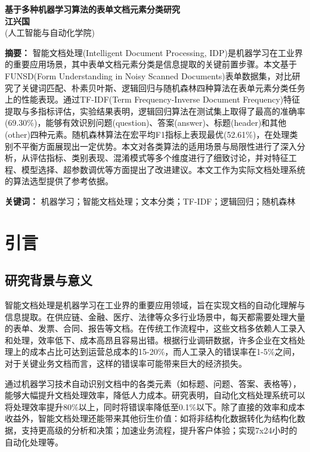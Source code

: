 \documentclass[12pt,a4paper]{article}
\begin{document}
\begin{center}
    {\huge \textbf{基于多种机器学习算法的表单文档元素分类研究}} \\
    \vspace{0.8cm}
    {\Large \textbf{江兴国}} \\
    \vspace{0.3cm}
    {\Large (人工智能与自动化学院)}
\end{center}

\vspace{1cm}

\noindent\textbf{摘要：} 智能文档处理(Intelligent Document Processing, IDP)是机器学习在工业界的重要应用场景，其中表单文档元素分类是信息提取的关键前置步骤。本文基于FUNSD(Form Understanding in Noisy Scanned Documents)表单数据集，对比研究了关键词匹配、朴素贝叶斯、逻辑回归与随机森林四种算法在表单元素分类任务上的性能表现。通过TF-IDF(Term Frequency-Inverse Document Frequency)特征提取与多指标评估，实验结果表明，逻辑回归算法在测试集上取得了最高的准确率(69.30\%)，能够有效识别问题(question)、答案(answer)、标题(header)和其他(other)四种元素。随机森林算法在宏平均F1指标上表现最优(52.61\%)，在处理类别不平衡方面展现出一定优势。本文对各类算法的适用场景与局限性进行了深入分析，从评估指标、类别表现、混淆模式等多个维度进行了细致讨论，并对特征工程、模型选择、超参数调优等方面提出了改进建议。本文工作为实际文档处理系统的算法选型提供了参考依据。

\vspace{0.5cm}

\noindent\textbf{关键词：} 机器学习；智能文档处理；文本分类；TF-IDF；逻辑回归；随机森林

\section{引言}

\subsection{研究背景与意义}

智能文档处理是机器学习在工业界的重要应用领域，旨在实现文档的自动化理解与信息提取。在供应链、金融、医疗、法律等众多行业场景中，每天都需要处理大量的表单、发票、合同、报告等文档。在传统工作流程中，这些文档多依赖人工录入和处理，效率低下、成本高昂且容易出错。根据行业调研数据，许多企业在文档处理上的成本占比可达到运营总成本的15-20\%，而人工录入的错误率在1-5\%之间，对于关键业务文档而言，这样的错误率可能带来巨大的经济损失。

通过机器学习技术自动识别文档中的各类元素（如标题、问题、答案、表格等），能够大幅提升文档处理效率，降低人力成本。研究表明，自动化文档处理系统可以将处理效率提升80\%以上，同时将错误率降低至0.1\%以下。除了直接的效率和成本收益外，智能文档处理还能带来其他衍生价值：如将非结构化数据转化为结构化数据，支持更高级的分析和决策；加速业务流程，提升客户体验；实现7x24小时的自动化处理等。
\end{document}
